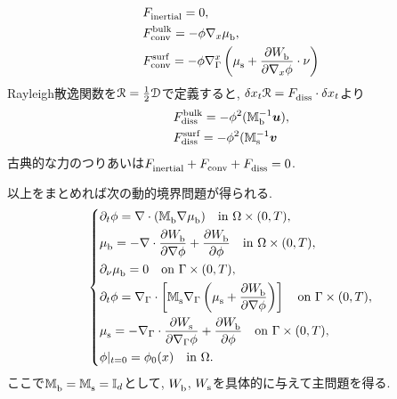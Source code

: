 \documentclass[openary, a4paper, oneside]{jsarticle}
\begin{document}
\begin{enumerate}
\begin{align}
		&{F}^{\text{}}_{\text{inertial}} = 0,\\
		&{F}^{\text{bulk}}_{\text{conv}} = -\phi\nabla_x{\mu}^{\text{}}_{\text{b}},\\
		&{F}^{\text{surf}}_{\text{conv}} = -\phi\nabla_{\Gamma}^x\left( {\mu}^{\text{}}_{\text{s}} + \frac{\partial{W}^{\text{}}_{\text{b}}}{\partial\nabla_x\phi}\cdot\nu\right)
	\end{align}
	Rayleigh散逸関数を$\mathcal{R}=\frac{1}{2}\mathcal{D}$で定義すると, $\delta{x_t}\mathcal{R} = {F}^{\text{}}_{\text{diss}}\cdot\delta x_t$より
	\begin{align}
		&{F}^{\text{bulk}}_{\text{diss}} = -\phi^2({\mathbb{M}}^{\text{$-1$}}_{\text{b}}\bm{u}),\\
		&{F}^{\text{surf}}_{\text{diss}} = -\phi^2({\mathbb{M}}^{\text{$-1$}}_{\text{s}}\bm{v}
	\end{align}
	古典的な力のつりあいは${F}^{\text{}}_{\text{inertial}} + {F}^{\text{}}_{\text{conv}} + {F}^{\text{}}_{\text{diss}} = 0$.
\end{enumerate}

以上をまとめれば次の動的境界問題が得られる.
\begin{equation}\left\{\begin{aligned}
	&\partial_t\phi = \nabla\cdot({\mathbb{M}}^{\text{}}_{\text{b}}\nabla{\mu}^{\text{}}_{\text{b}}) \quad\text{in }\Omega\times(0,T),\\
	&{\mu}^{\text{}}_{\text{b}} = -\nabla\cdot\frac{\partial{W}^{\text{}}_{\text{b}}}{\partial\nabla\phi} + \frac{\partial{W}^{\text{}}_{\text{b}}}{\partial\phi} \quad\text{in }\Omega\times(0,T),\\
	&\partial_{\nu}{\mu}^{\text{}}_{\text{b}} = 0 \quad\text{on }\Gamma\times(0,T),\\
	&\partial_t\phi = \nabla_{\Gamma}\cdot\left[ {\mathbb{M}}^{\text{}}_{\text{s}}\nabla_{\Gamma}\left({\mu}^{\text{}}_{\text{s}} + \frac{\partial{W}^{\text{}}_{\text{b}}}{\partial\nabla\phi}\right) \right] \quad\text{on }\Gamma\times(0,T),\\
	&{\mu}^{\text{}}_{\text{s}} = -\nabla_{\Gamma}\cdot\frac{\partial{W}^{\text{}}_{\text{s}}}{\partial\nabla_{\Gamma}\phi} + \frac{\partial{W}^{\text{}}_{\text{b}}}{\partial\phi} \quad\text{on }\Gamma\times(0,T),\\
	&\phi|_{t=0} = \phi_0(x) \quad\text{in }\Omega.
\end{aligned}\right.\end{equation}
ここで${\mathbb{M}}^{\text{}}_{\text{b}}={\mathbb{M}}^{\text{}}_{\text{s}}=\mathbb{I}_d$として, ${W}^{\text{}}_{\text{b}}$, ${W}^{\text{}}_{\text{s}}$を具体的に与えて主問題を得る.
\end{document}
